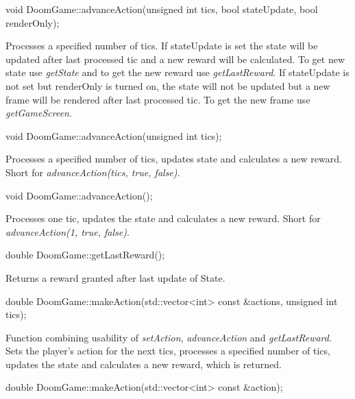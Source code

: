 \documentclass[english,bachelor,a4paper,twoside]{ppfcmthesis}
\begin{document}
\vspace{20pt}
\begin{clinee}
	void DoomGame::advanceAction(unsigned int tics, bool stateUpdate, bool renderOnly);
\end{clinee}

    	Processes a specified number of tics. If stateUpdate is set the state will be updated after last processed tic and a new reward will be calculated. To get new state use \emph{getState} and to get the new reward use  \emph{getLastReward}. If stateUpdate is not set but renderOnly is turned on, the state will not be updated but a new frame will be rendered after last processed tic. To get the new frame use \emph{getGameScreen}.

\vspace{20pt}
\begin{clinee}
	void DoomGame::advanceAction(unsigned int tics);
\end{clinee}

    	Processes a specified number of tics, updates state and calculates a new reward. Short for \emph{advanceAction(tics, true, false)}.


\vspace{20pt}
\begin{clinee}
	void DoomGame::advanceAction();
\end{clinee}

	Processes one tic, updates the state and calculates a new reward. Short for \emph{advanceAction(1, true, false)}.


\vspace{20pt}
\begin{clinee}
	double DoomGame::getLastReward();
\end{clinee}

	Returns a reward granted after last update of State. 


\vspace{20pt}
\begin{clinee}
	double DoomGame::makeAction(std::vector<int> const &actions, unsigned int tics);
\end{clinee}

	Function combining usability of \emph{setAction}, \emph{advanceAction} and \emph{getLastReward}. Sets the player's action for the next tics, processes a specified number of tics, updates the state and calculates a new reward, which is returned.

\vspace{20pt}   
\begin{clinee}
	double DoomGame::makeAction(std::vector<int> const &action);
\end{clinee}
\end{document}
